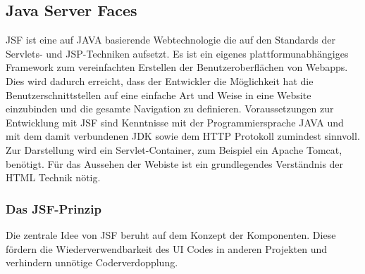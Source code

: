 \documentclass[12pt, twoside, a4paper, ngerman]{article}
\begin{document}
\subsection{Java Server Faces}

JSF ist eine auf JAVA basierende Webtechnologie die auf den Standards der Servlets- und JSP-Techniken aufsetzt.
Es ist ein eigenes plattformunabhängiges Framework zum vereinfachten Erstellen der Benutzeroberflächen von Webapps.
Dies wird dadurch erreicht, dass der Entwickler die Möglichkeit hat die Benutzerschnittstellen auf eine einfache Art und Weise in eine Website einzubinden und die gesamte Navigation zu definieren.
Voraussetzungen zur Entwicklung mit JSF sind Kenntnisse mit der Programmiersprache JAVA und mit dem damit verbundenen \gls{JDK} sowie dem \gls{HTTP} Protokoll zumindest sinnvoll.
Zur Darstellung wird ein Servlet-Container, zum Beispiel ein Apache Tomcat, benötigt.
Für das Aussehen der Webiste ist ein grundlegendes Verständnis der HTML Technik nötig.

\subsubsection{Das JSF-Prinzip}

Die zentrale Idee von JSF beruht auf dem Konzept der Komponenten. Diese fördern die Wiederverwendbarkeit des UI Codes in anderen Projekten und verhindern unnötige Coderverdopplung.
\end{document}
